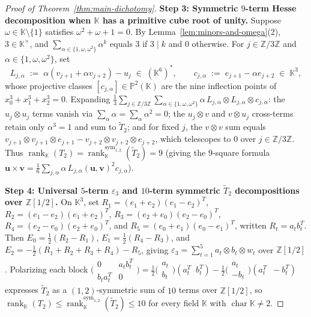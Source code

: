 \documentclass[11pt,reqno]{amsart}
\theoremstyle{definition}
\theoremstyle{remark}
\numberwithin{equation}{section}
\newcommand{\KK}{\mathbb{K}}
\newcommand{\ZZ}{\mathbb{Z}}
\newcommand{\PP}{\mathbb{P}}
\DeclareMathOperator{\rk}{rank}
\DeclareMathOperator{\chr}{char}
\begin{document}
\begin{proof}[Proof of Theorem~\ref{thm:main-dichotomy}]
\medskip
\noindent\textbf{Step 3: Symmetric $9$-term Hesse decomposition when $\KK$ has a primitive cube root of unity.}
Suppose $\omega \in \KK\setminus\{1\}$ satisfies $\omega^2 + \omega + 1 = 0$. By Lemma~\ref{lem:minors-and-omega}(2), $3 \in \KK^\times$, and $\sum_{\alpha \in \{1, \omega, \omega^2\}} \alpha^k$ equals $3$ if $3 \mid k$ and $0$ otherwise. For $j \in \ZZ/3\ZZ$ and $\alpha \in \{1, \omega, \omega^2\}$, set
\begin{equation}\label{eq:hesse-forms}
  L_{j, \alpha} \;:=\; \alpha(v_{j+1} + \alpha v_{j+2}) - u_j \;\in\; (\KK^6)^*, \qquad
  c_{j, \alpha} \;:=\; e_{j+1} - \alpha e_{j+2} \;\in\; \KK^3,
\end{equation}
whose projective classes $[c_{j,\alpha}] \in \PP^2(\KK)$ are the nine inflection points of $x_0^3 + x_1^3 + x_2^3 = 0$. Expanding $\frac{1}{3}\sum_{j \in \ZZ/3\ZZ}\sum_{\alpha \in \{1, \omega, \omega^2\}} \alpha\, L_{j,\alpha} \otimes L_{j,\alpha} \otimes c_{j,\alpha}$: the $u_j \otimes u_j$ terms vanish via $\sum_\alpha \alpha = \sum_\alpha \alpha^2 = 0$; the $u_j \otimes v$ and $v \otimes u_j$ cross-terms retain only $\alpha^3 = 1$ and sum to $\widetilde{T}_2$; and for fixed $j$, the $v \otimes v$ sum equals $v_{j+1} \otimes v_{j+1} \otimes e_{j+1} - v_{j+2} \otimes v_{j+2} \otimes e_{j+2}$, which telescopes to $0$ over $j \in \ZZ/3\ZZ$. Thus $\rk_{\KK}(T_2) = \rk_{\KK}^{\mathrm{sym}_{1,2}}(\widetilde{T}_2) = 9$ (giving the $9$-square formula $\mathbf{u} \times \mathbf{v} = \frac{1}{6}\sum_{j,\alpha} \alpha\, L_{j,\alpha}(\mathbf{u}, \mathbf{v})^2 c_{j,\alpha}$).

\medskip
\noindent\textbf{Step 4: Universal $5$-term $\varepsilon_3$ and $10$-term symmetric $\widetilde{T}_2$ decompositions over $\ZZ[1/2]$.}
On $\KK^3$, set $R_1 = (e_1 + e_2)(e_1 - e_2)^T$, $R_2 = (e_1 - e_2)(e_1 + e_2)^T$, $R_3 = (e_2 + e_0)(e_2 - e_0)^T$, $R_4 = (e_2 - e_0)(e_2 + e_0)^T$, and $R_5 = (e_0 + e_1)(e_0 - e_1)^T$, written $R_t = a_t b_t^T$. Then $E_0 = \frac{1}{2}(R_2 - R_1)$, $E_1 = \frac{1}{2}(R_4 - R_3)$, and $E_2 = -\frac{1}{2}(R_1 + R_2 + R_3 + R_4) - R_5$, giving $\varepsilon_3 = \sum_{t=1}^5 a_t \otimes b_t \otimes w_t$ over $\ZZ[1/2]$. Polarizing each block $\bigl(\begin{smallmatrix} 0 & a_t b_t^T \\ b_t a_t^T & 0 \end{smallmatrix}\bigr) = \frac{1}{2}\bigl(\begin{smallmatrix} a_t \\ b_t \end{smallmatrix}\bigr)(a_t^T\;\; b_t^T) - \frac{1}{2}\bigl(\begin{smallmatrix} a_t \\ -b_t \end{smallmatrix}\bigr)(a_t^T\;\; -b_t^T)$ expresses $\widetilde{T}_2$ as a $(1,2)$-symmetric sum of $10$ terms over $\ZZ[1/2]$, so $\rk_{\KK}(T_2) \le \rk_{\KK}^{\mathrm{sym}_{1,2}}(\widetilde{T}_2) \le 10$ for every field $\KK$ with $\chr\KK \neq 2$.


\end{proof}
\end{document}
